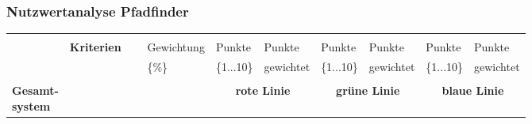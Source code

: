 \documentclass[main.tex]{subfiles} %
\begin{document}
\begin{landscape} %
    \thispagestyle{fancy}

    \subsubsection{Nutzwertanalyse Pfadfinder}

    \begin{table}[ht]
        \centering
        \begin{tabular}{|p{0.11\linewidth}|p{0.18\linewidth}|p{0.085\linewidth}|p{0.057\linewidth}|p{0.07\linewidth}|p{0.057\linewidth}|p{0.07\linewidth}|p{0.057\linewidth}|p{0.07\linewidth}|}
            \hline
                                                      &                                     &                                            &                                           &                                            &            &             &            &             \\[-9pt]
                                                      & \multirow{2}{*}{\textbf{Kriterien}} & Gewichtung                                 & Punkte                                    & Punkte                                     & Punkte     & Punkte      & Punkte     & Punkte      \\[1pt]
                                                      &                                     & \{\%\}                                     & \{1...10\}                                & gewichtet                                  & \{1...10\} & gewichtet   & \{1...10\} & gewichtet   \\[1pt]
            \hline
            \hline
                                                      & \multicolumn{2}{c|}{}               & \multicolumn{2}{c|}{}                      & \multicolumn{2}{c|}{}                     & \multicolumn{2}{c|}{}                                                                            \\[-9pt]
            \multirow{7}{4em}{\textbf{Gesamt-system}} & \multicolumn{2}{c|}{}               & \multicolumn{2}{c|}{\textbf{rote Linie}}   & \multicolumn{2}{c|}{\textbf{grüne Linie}} & \multicolumn{2}{c|}{\textbf{blaue Linie}}                                                        \\[1pt]
            \cline{2-9}
                                                      &                                     &                                            &                                           &                                            &            &             &            &             \\[-9pt]

\end{tabular}
\end{table}
\end{landscape}
\end{document}
